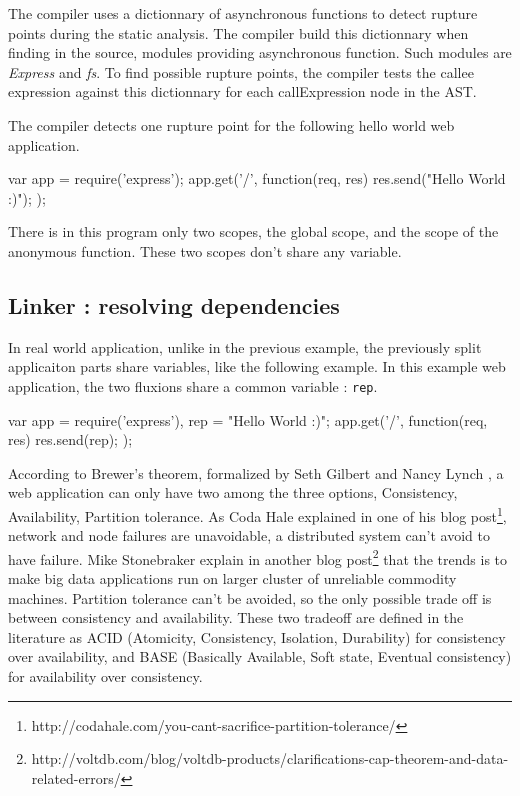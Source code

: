 The compiler uses a dictionnary of asynchronous functions to detect rupture points during the static analysis.
The compiler build this dictionnary when finding in the source, modules providing asynchronous function.
Such modules are \textit{Express} and \textit{fs}.
To find possible rupture points, the compiler tests the callee expression against this dictionnary for each callExpression node in the AST.

The compiler detects one rupture point for the following hello world web application. 

\begin{code}[Javascript, caption={Hello World},label={lst:hello}]
var app = require('express');
app.get('/', function(req, res) {
  res.send("Hello World :)");
});
\end{code}


There is in this program only two scopes, the global scope, and the scope of the anonymous function.
These two scopes don't share any variable.

\subsection{Linker : resolving dependencies} \label{ss:linker}

In real world application, unlike in the previous example, the previously split applicaiton parts share variables, like the following example.
In this example web application, the two fluxions share a common variable : \texttt{rep}.

\begin{code}[Javascript, caption={Hello World with a shared variable},label={lst:sharedhello}]
var app = require('express'),
    rep = "Hello World :)";
app.get('/', function(req, res) {
  res.send(rep);
});
\end{code}

According to Brewer's theorem, formalized by Seth Gilbert and Nancy Lynch \cite{Gilbert2002}, a web application can only have two among the three options, Consistency, Availability, Partition tolerance.
As Coda Hale explained in one of his blog post\footnote{http://codahale.com/you-cant-sacrifice-partition-tolerance/}, network and node failures are unavoidable, a distributed system can't avoid to have failure.
Mike Stonebraker explain in another blog post\footnote{http://voltdb.com/blog/voltdb-products/clarifications-cap-theorem-and-data-related-errors/} that the trends is to make big data applications run on larger cluster of unreliable commodity machines.
Partition tolerance can't be avoided, so the only possible trade off is between consistency and availability.
These two tradeoff are defined in the literature as ACID (Atomicity, Consistency, Isolation, Durability) for consistency over availability, and BASE (Basically Available, Soft state, Eventual consistency) for availability over consistency.

